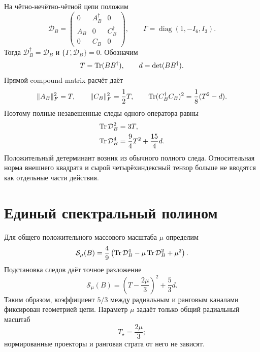 На чётно-нечётно-чётной цепи положим
\begin{equation}
 \mathcal D_B=
 \begin{pmatrix}
 0&A_B^\dagger&0\\
 A_B&0&C_B^\dagger\\
 0&C_B&0
 \end{pmatrix},
 \qquad
 \Gamma=\operatorname{diag}(1,-I_6,I_3).
 \label{eq:v7-coherence-parent-dirac}
\end{equation}
Тогда $\mathcal D_B^\dagger=\mathcal D_B$ и
$\{\Gamma,\mathcal D_B\}=0$. Обозначим
\begin{equation}
 T=\operatorname{Tr}(BB^\dagger),\qquad d=\det(BB^\dagger).
 \label{eq:v7-coherence-parent-invariants}
\end{equation}
Прямой compound-matrix расчёт даёт
\begin{equation}
 \|A_B\|_F^2=T,\qquad
 \|C_B\|_F^2=\frac12T,\qquad
 \operatorname{Tr}(C_B^\dagger C_B)^2=\frac18(T^2-d).
 \label{eq:v7-coherence-parent-edge-traces}
\end{equation}
Поэтому полные незавешенные следы одного оператора равны
\begin{align}
 \operatorname{Tr}\mathcal D_B^2&=3T,\\
 \operatorname{Tr}\mathcal D_B^4&=\frac94T^2+\frac{15}{4}d.
 \label{eq:v7-coherence-parent-spectral-traces}
\end{align}
Положительный детерминант возник из обычного полного следа. Относительная
норма внешнего квадрата и сырой четырёхиндексный тензор больше не вводятся
как отдельные части действия.

\section{Единый спектральный полином}

Для общего положительного массового масштаба $\mu$ определим
\begin{equation}
 \mathcal S_\mu(B)
 =\frac49\left(
 \operatorname{Tr}\mathcal D_B^4-\mu\operatorname{Tr}\mathcal D_B^2+\mu^2
 \right).
 \label{eq:v7-coherence-parent-action}
\end{equation}
Подстановка следов даёт точное разложение
\begin{equation}
 \boxed{
 \mathcal S_\mu(B)
 =\left(T-\frac{2\mu}{3}\right)^2+\frac53d.}
 \label{eq:v7-coherence-parent-reduction}
\end{equation}
Таким образом, коэффициент $5/3$ между радиальным и ранговым каналами
фиксирован геометрией цепи. Параметр $\mu$ задаёт только общий радиальный
масштаб
\begin{equation}
 T_\star=\frac{2\mu}{3};
 \label{eq:v7-coherence-parent-radius}
\end{equation}
нормированные проекторы и ранговая страта от него не зависят.

